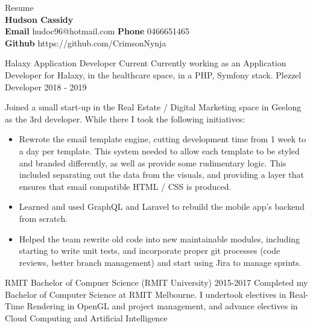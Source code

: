 \documentclass[9pt]{developercv}
\begin{document}
	\begin{minipage}[a]{1.0\textwidth}
		\begin{center}	%
			{\HUGE Resume}\\
			\textbf {Hudson Cassidy} \\
			\textbf {Email} hudoc96@hotmail.com
			\textbf {Phone} 0466651465 \\
			\textbf {Github} https://github.com/CrimsonNynja \\
		\end{center}
	\end{minipage}
	\begin{minipage}[t]{0.7\textwidth}
		\begin{entrylist}	%
			\entry
				{Halaxy}
				{Application Developer}
				{Current}
				{Currently working as an Application Developer for Halaxy, in the healthcare space, in a PHP, Symfony stack.}
			\entry
				{Plezzel}
				{Developer}
				{2018 - 2019}
				{Joined a small start-up in the Real Estate / Digital Marketing space in Geelong as the 3rd developer. While there I took the following initiatives:
				\begin{itemize}
					\item Rewrote the email template engine, cutting development time from 1 week to a day per template. This system needed to allow each template to be styled and branded differently, as well as provide some rudimentary logic. This included separating out the data from the visuals, and providing a layer that ensures that email compatible HTML / CSS is produced.
					\item Learned and used GraphQL and Laravel to rebuild the mobile app's backend from scratch.
					\item Helped the team rewrite old code into new maintainable modules, including starting to write unit tests, and incorporate proper git processes (code reviews, better branch management) and start using Jira to manage sprints.
				\end{itemize}
				}
		\end{entrylist}			
		\begin{entrylist}	%
			\entry
				{RMIT}
				{Bachelor of Compuer Science (RMIT University)}
				{2015-2017}
				{Completed my Bachelor of Computer Science at RMIT Melbourne. I undertook electives in Real-Time Rendering in OpenGL and project management, and advance electives in Cloud Computing and Artificial Intelligence }
		\end{entrylist}

\end{minipage}
\end{document}
